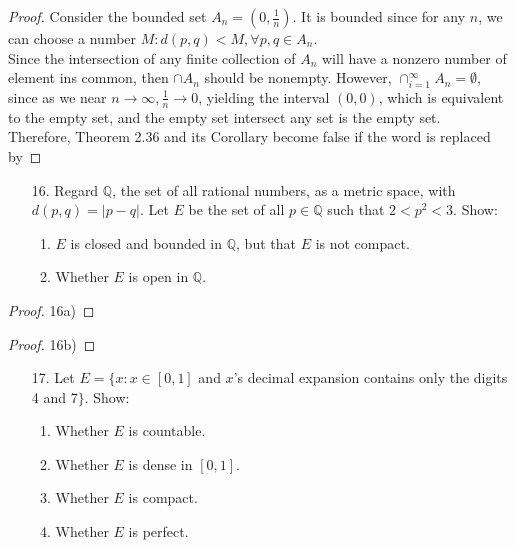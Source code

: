 \documentclass[10pt]{article}
\theoremstyle{definition}
\theoremstyle{plain}
\newcommand{\Q}{\mathbb{Q}}
\begin{document}
\begin{proof}
Consider the bounded set $A_n = (0, \frac{1}{n})$. It is bounded since for any $n$, we can choose a number $M: d(p,q) < M, \forall p,q\in A_n$. \\

Since the intersection of any finite collection of $A_n$ will have a nonzero number of element ins common, then $\cap A_n$ should be nonempty. However, $\cap_{i=1}^\infty A_n = \emptyset$, since as we near $n\rightarrow\infty, \frac{1}{n}\rightarrow 0$, yielding the interval $(0,0)$, which is equivalent to the empty set, and the empty set intersect any set is the empty set. \\

Therefore, Theorem 2.36 and its Corollary become false if the word  is replaced by 
\end{proof}




\pagebreak



\begin{enumerate}
\item[16.] Regard $\Q$, the set of all rational numbers, as a metric space, with $d(p,q)=|p-q|$. Let $E$ be the set of all $p\in \Q$ such that $2<p^2<3$. Show:
\begin{enumerate}
\item $E$ is closed and bounded in $\Q$, but that $E$ is not compact.
\item Whether $E$ is open in $\Q$.
\end{enumerate}
\end{enumerate}

\begin{proof}
16a)


\end{proof}

\begin{proof}
16b)
\end{proof}



\pagebreak



\begin{enumerate}
\item[17.] Let $E = \{x: x\in [0,1]$ and $x$'s decimal expansion contains only the digits 4 and 7$\}$. Show:
\begin{enumerate}
\item Whether $E$ is countable.
\item Whether $E$ is dense in $[0,1]$.
\item Whether $E$ is compact.
\item Whether $E$ is perfect.
\end{enumerate}
\end{enumerate}
\end{document}
